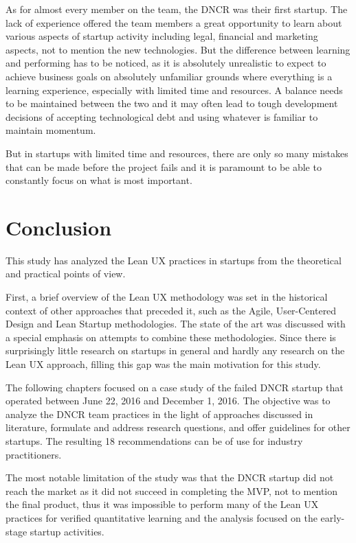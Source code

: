 \documentclass{article}
\begin{document}
As for almost every member on the team, the DNCR was their first startup. The lack of experience offered the team members a great opportunity to learn about various aspects of startup activity including legal, financial and marketing aspects, not to mention the new technologies. But the difference between learning and performing has to be noticed, as it is absolutely unrealistic to expect to achieve business goals on absolutely unfamiliar grounds where everything is a learning experience, especially with limited time and resources. A balance needs to be maintained between the two and it may often lead to tough development decisions of accepting technological debt and using whatever is familiar to maintain momentum.

But in startups with limited time and resources, there are only so many mistakes that can be made before the project fails and it is paramount to be able to constantly focus on what is most important.

\section{Conclusion}
This study has analyzed the Lean UX practices in startups from the theoretical and practical points of view.

First, a brief overview of the Lean UX methodology was set in the historical context of other approaches that preceded it, such as the Agile, User-Centered Design and Lean Startup methodologies. The state of the art was discussed with a special emphasis on attempts to combine these methodologies. Since there is surprisingly little research on startups in general and hardly any research on the Lean UX approach, filling this gap was the main motivation for this study.

The following chapters focused on a case study of the failed DNCR startup that operated between June 22, 2016 and December 1, 2016. The objective was to analyze the DNCR team practices in the light of approaches discussed in literature, formulate and address research questions, and offer guidelines for other startups. The resulting 18 recommendations can be of use for industry practitioners.

The most notable limitation of the study was that the DNCR startup did not reach the market as it did not succeed in completing the MVP, not to mention the final product, thus it was impossible to perform many of the Lean UX practices for verified quantitative learning and the analysis focused on the early-stage startup activities.
\end{document}
